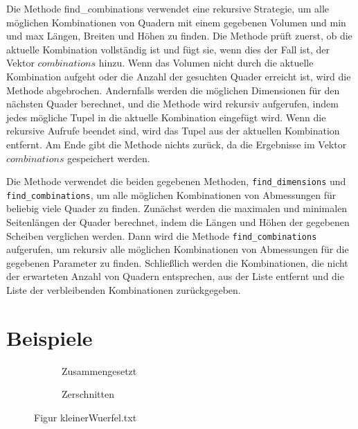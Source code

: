 \documentclass[a4paper,10pt,ngerman]{scrartcl}
\newcommand{\simplecube}[8]%
{
    \begin{scope}[shift={#1}]
        \fill[gray!40,canvas is yz plane at x=#2, opacity=#8] (0,0) rectangle (#3,#4);
        \fill[gray!10,canvas is xz plane at y=#3, opacity=#8] (0,0) rectangle (#2,#4);
        \fill[white  ,canvas is xy plane at z=#4, opacity=#8] (0,0) rectangle (#2,#3);
        \foreach\i/\j in {0/1, 1/1, 1/0}
            {
            \draw[line#5] (0,#3*\i,#4*\j) --++ (#2,0,0);
            \draw[line#6] (#2*\i,0,#4*\j) --++ (0,#3,0);
            \draw[line#7] (#2*\i,#3*\j,0) --++ (0,0,#4);
        }
    \end{scope}
}
\newcommand{\smallSquare}[4]%
{
    \begin{scope}[shift={#1}]
        \simplecube{(0,     0,      0)}     {1}{2}{2}   {a}{a}{a}   {1}
        \simplecube{(1+#4,   0,      0))}    {1}{2}{2}   {a}{a}{a}   {1}
    \end{scope}
}
\begin{document}
    Die Methode find\_combinations verwendet eine rekursive Strategie,
    um alle möglichen Kombinationen von Quadern mit einem gegebenen Volumen und min und max Längen, Breiten und Höhen zu finden.
    Die Methode prüft zuerst, ob die aktuelle Kombination vollständig ist und fügt sie, wenn dies der Fall ist, der Vektor $combinations$ hinzu.
    Wenn das Volumen nicht durch die aktuelle Kombination aufgeht oder die Anzahl der gesuchten Quader erreicht ist, wird die Methode abgebrochen.
    Andernfalls werden die möglichen Dimensionen für den nächsten Quader berechnet, und die Methode wird rekursiv aufgerufen,
    indem jedes mögliche Tupel in die aktuelle Kombination eingefügt wird.
    Wenn die rekursive Aufrufe beendet sind, wird das Tupel aus der aktuellen Kombination entfernt.
    Am Ende gibt die Methode nichts zurück, da die Ergebnisse im Vektor $combinations$ gespeichert werden.

    Die Methode verwendet die beiden gegebenen Methoden, \texttt{find\_dimensions} und \texttt{find\_combinations},
    um alle möglichen Kombinationen von Abmessungen für beliebig viele Quader zu finden.
    Zunächst werden die maximalen und minimalen Seitenlängen der Quader berechnet, indem die Längen und Höhen der gegebenen Scheiben verglichen werden.
    Dann wird die Methode \texttt{find\_combinations} aufgerufen, um rekursiv alle möglichen Kombinationen von Abmessungen für die gegebenen Parameter zu finden.
    Schließlich werden die Kombinationen, die nicht der erwarteten Anzahl von Quadern entsprechen, aus der Liste entfernt
    und die Liste der verbleibenden Kombinationen zurückgegeben.
    \newpage

    \section{Beispiele}\label{sec:beispiele}

    \begin{figure}[H]
        \centering
        \def\a{3.2}
        \def\b{1.2}
        \begin{subfigure}[b]{0.45\textwidth}
            \centering %
            \caption{Zusammengesetzt}\label{fig:figA2}
        \end{subfigure}
        \begin{subfigure}[b]{0.45\textwidth}
            \centering %
            \caption{Zerschnitten}\label{fig:figB2}
        \end{subfigure}
        \caption{Figur kleinerWuerfel.txt}\label{fig:figAB2}
    \end{figure}
\end{document}
